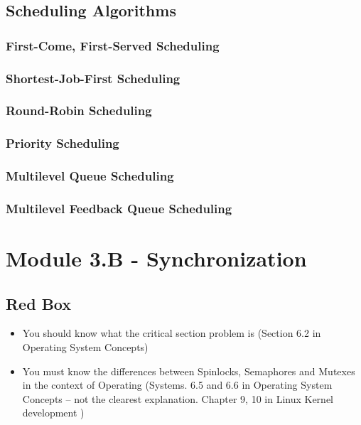 \documentclass{article}
\begin{document}
\subsection{Scheduling Algorithms}

\subsubsection{First-Come, First-Served Scheduling}


\subsubsection{Shortest-Job-First Scheduling}



\subsubsection{Round-Robin Scheduling}




\subsubsection{Priority Scheduling}



\subsubsection{Multilevel Queue Scheduling}



\subsubsection{Multilevel Feedback Queue Scheduling}





\section{Module 3.B - Synchronization}
\subsection{Red Box}
\begin{itemize}
    \item You should know what the critical section problem is (Section 6.2 in Operating System Concepts)
    \item You must know the differences between Spinlocks, Semaphores and Mutexes in the context of Operating
    (Systems. 6.5 and 6.6 in Operating System Concepts – not the clearest explanation. Chapter 9, 10 in Linux Kernel
    development )
\end{itemize}
\end{document}
